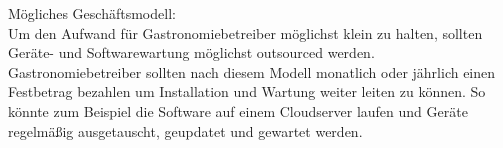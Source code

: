 \noindent
Mögliches Geschäftsmodell: \\
Um den Aufwand für Gastronomiebetreiber möglichst klein zu halten, sollten Geräte- und Softwarewartung möglichst outsourced werden. Gastronomiebetreiber sollten nach diesem Modell monatlich oder jährlich einen Festbetrag bezahlen um Installation und Wartung weiter leiten zu können. So könnte zum Beispiel die Software auf einem Cloudserver laufen und Geräte regelmäßig ausgetauscht, geupdatet und gewartet werden.

\nocite{online:getting-started-load-cells}
\nocite{doc:getting-started}
\nocite{wiki:load-cell}
\nocite{wiki:Force-sensing-resistor}
\nocite{wiki:Piezoelectric-sensor}
\nocite{online:ic880a-gateway}
\nocite{online:datalink}
\nocite{online:lorawan-security}
\nocite{excel:lorawan-airtime}
\nocite{picture:spreading-factor}
\nocite{picture:lorawan}
\nocite{doc:rn2483}
\nocite{doc:lora-documentation}

\printbibliography
